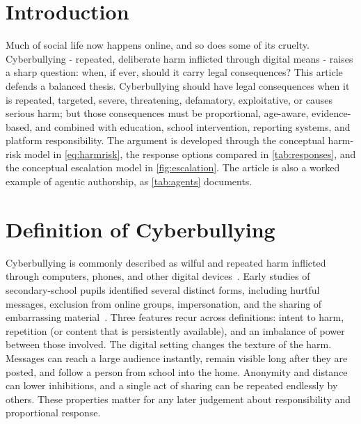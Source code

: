 \documentclass[11pt,a4paper]{report}
\begin{document}
\tableofcontents
\cleardoublepage
{}

\chapter{Introduction}
Much of social life now happens online, and so does some of its cruelty.
Cyberbullying - repeated, deliberate harm inflicted through digital means -
raises a sharp question: when, if ever, should it carry legal consequences?
This article defends a balanced thesis. Cyberbullying should have legal
consequences when it is repeated, targeted, severe, threatening, defamatory,
exploitative, or causes serious harm; but those consequences must be
proportional, age-aware, evidence-based, and combined with education, school
intervention, reporting systems, and platform responsibility. The argument is
developed through the conceptual harm-risk model in \autoref{eq:harmrisk},
the response options compared in \autoref{tab:responses}, and the conceptual
escalation model in \autoref{fig:escalation}. The article is also a worked
example of agentic authorship, as \autoref{tab:agents} documents.

\chapter{Definition of Cyberbullying}
Cyberbullying is commonly described as wilful and repeated harm inflicted
through computers, phones, and other digital devices~\cite{patchin2006}. Early
studies of secondary-school pupils identified several distinct forms,
including hurtful messages, exclusion from online groups, impersonation, and
the sharing of embarrassing material~\cite{smith2008}. Three features recur
across definitions: intent to harm, repetition (or content that is
persistently available), and an imbalance of power between those involved.
The digital setting changes the texture of the harm. Messages can reach a
large audience instantly, remain visible long after they are posted, and
follow a person from school into the home. Anonymity and distance can lower
inhibitions, and a single act of sharing can be repeated endlessly by others.
These properties matter for any later judgement about responsibility and
proportional response.
\end{document}
